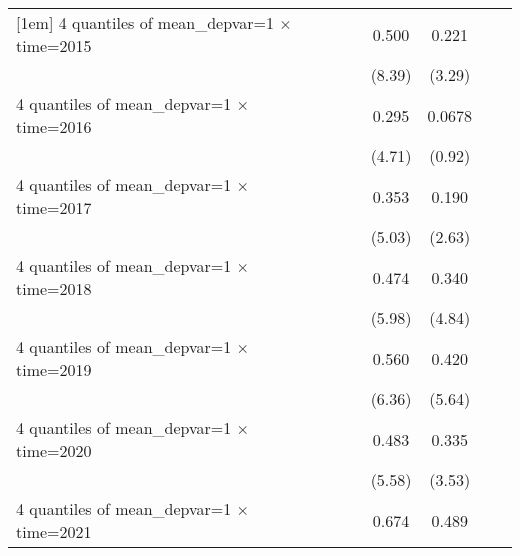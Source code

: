 \begin{table}[htbp]
\begin{tabular}{l*{6}{c}}
[1em]
4 quantiles of mean\_depvar=1 $\times$ time=2015&                     &                     &       0.500\sym{***}&       0.221\sym{***}&                     &                     \\
                    &                     &                     &      (8.39)         &      (3.29)         &                     &                     \\
[1em]
4 quantiles of mean\_depvar=1 $\times$ time=2016&                     &                     &       0.295\sym{***}&      0.0678         &                     &                     \\
                    &                     &                     &      (4.71)         &      (0.92)         &                     &                     \\
[1em]
4 quantiles of mean\_depvar=1 $\times$ time=2017&                     &                     &       0.353\sym{***}&       0.190\sym{**} &                     &                     \\
                    &                     &                     &      (5.03)         &      (2.63)         &                     &                     \\
[1em]
4 quantiles of mean\_depvar=1 $\times$ time=2018&                     &                     &       0.474\sym{***}&       0.340\sym{***}&                     &                     \\
                    &                     &                     &      (5.98)         &      (4.84)         &                     &                     \\
[1em]
4 quantiles of mean\_depvar=1 $\times$ time=2019&                     &                     &       0.560\sym{***}&       0.420\sym{***}&                     &                     \\
                    &                     &                     &      (6.36)         &      (5.64)         &                     &                     \\
[1em]
4 quantiles of mean\_depvar=1 $\times$ time=2020&                     &                     &       0.483\sym{***}&       0.335\sym{***}&                     &                     \\
                    &                     &                     &      (5.58)         &      (3.53)         &                     &                     \\
[1em]
4 quantiles of mean\_depvar=1 $\times$ time=2021&                     &                     &       0.674\sym{***}&       0.489\sym{***}&                     &                     \\

\end{tabular}
\end{table}
